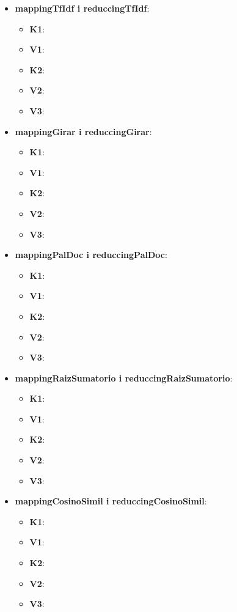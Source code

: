 \documentclass[11pt,a4paper]{article}
\begin{document}
\begin{itemize}
\begin{itemize}
			\item \textbf{mappingTfIdf i reduccingTfIdf}:
			\begin{itemize}
				\item \textbf{K1}:
				\item \textbf{V1}:
				\item \textbf{K2}:
				\item \textbf{V2}:
				\item \textbf{V3}:
			\end{itemize}
			
			\item \textbf{mappingGirar i reduccingGirar}:
			\begin{itemize}
				\item \textbf{K1}:
				\item \textbf{V1}:
				\item \textbf{K2}:
				\item \textbf{V2}:
				\item \textbf{V3}:
			\end{itemize}
			
			\item \textbf{mappingPalDoc i reduccingPalDoc}:
			\begin{itemize}
				\item \textbf{K1}:
				\item \textbf{V1}:
				\item \textbf{K2}:
				\item \textbf{V2}:
				\item \textbf{V3}:
			\end{itemize}
			
			\item \textbf{mappingRaizSumatorio i reduccingRaizSumatorio}:
			\begin{itemize}
				\item \textbf{K1}:
				\item \textbf{V1}:
				\item \textbf{K2}:
				\item \textbf{V2}:
				\item \textbf{V3}:
			\end{itemize}
			
			\item \textbf{mappingCosinoSimil i reduccingCosinoSimil}:
			\begin{itemize}
				\item \textbf{K1}:
				\item \textbf{V1}:
				\item \textbf{K2}:
				\item \textbf{V2}:
				\item \textbf{V3}:
			\end{itemize}
		\end{itemize}
		
	\end{itemize}
\end{document}
